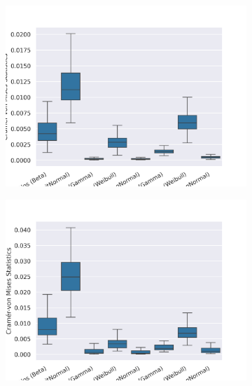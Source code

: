 \documentclass[10pt,letterpaper]{article}
\begin{document}
\begin{figure}[h!]
	\caption{The Cramér-von Mises criterion for the different distributions and datasets. (The lower the better.)}
	
	\centering
	\begin{subfigure}[b]{0.45\textwidth}
		\centering
		\includegraphics[width=\textwidth]{figures/yule-100-ccd1-cvm.png}
	\end{subfigure}
	\begin{subfigure}[b]{0.45\textwidth}
		\centering
		\includegraphics[width=\textwidth]{figures/yule-200-ccd1-cvm.png}
	\end{subfigure}
	

\end{figure}
\end{document}
